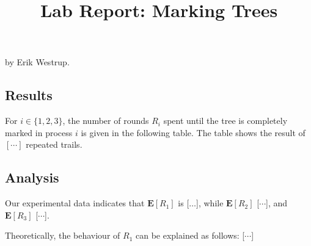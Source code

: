 \documentclass{tufte-handout}
\title{\sf Lab Report: Marking Trees}
\date{}
\begin{document}
\maketitle

by Erik Westrup. 

\subsection{Results}

For $i\in\{1,2,3\}$, the number of rounds $R_i$ spent until the tree
is completely marked in process $i$ is given in the following table.
The table shows the result of $[\cdots]$ repeated
trails.



\subsection{Analysis}

Our experimental data indicates that $\mathbf E [R_1]$ is [$\ldots$],
while $\mathbf E[R_2]$ [$\cdots$], and $\mathbf E[R_3]$
[$\cdots$].

Theoretically, the behaviour of $R_1$ can be explained as follows: [$\cdots$] 
\end{document}
